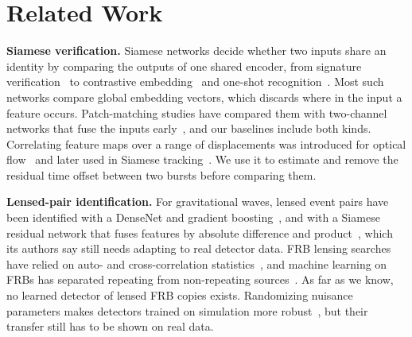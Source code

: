 \documentclass[conference]{IEEEtran}
\begin{document}
\section{Related Work}
\textbf{Siamese verification.} Siamese networks decide whether two inputs share an identity by comparing the outputs of
one shared encoder, from signature verification~\cite{Bromley1993} to contrastive embedding~\cite{Hadsell2006} and one-shot
recognition~\cite{Koch2015}. Most such networks compare global
embedding vectors, which discards where in the input a feature occurs. Patch-matching studies have compared them with
two-channel networks that fuse the inputs early~\cite{Zagoruyko2015}, and our baselines include both kinds. Correlating
feature maps over a range of displacements was introduced for optical flow~\cite{Dosovitskiy2015} and later used in Siamese
tracking~\cite{Bertinetto2016}. We use it to estimate and remove the residual time offset between two bursts before
comparing them.

\textbf{Lensed-pair identification.} For gravitational waves, lensed event pairs have been identified with a DenseNet and
gradient boosting~\cite{Goyal2021}, and with a Siamese residual network that fuses features by absolute difference and
product~\cite{Zhang2026}, which its authors say still needs adapting to real detector data. FRB lensing searches have
relied on auto- and cross-correlation statistics~\cite{Kader2022,Chang2024,Krochek2022}, and machine learning on FRBs has
separated repeating from non-repeating sources~\cite{Chen2022}. As far as we know, no learned detector of lensed FRB copies
exists. Randomizing nuisance parameters makes detectors trained on simulation more robust~\cite{Tobin2017}, but their
transfer still has to be shown on real data.
\end{document}
